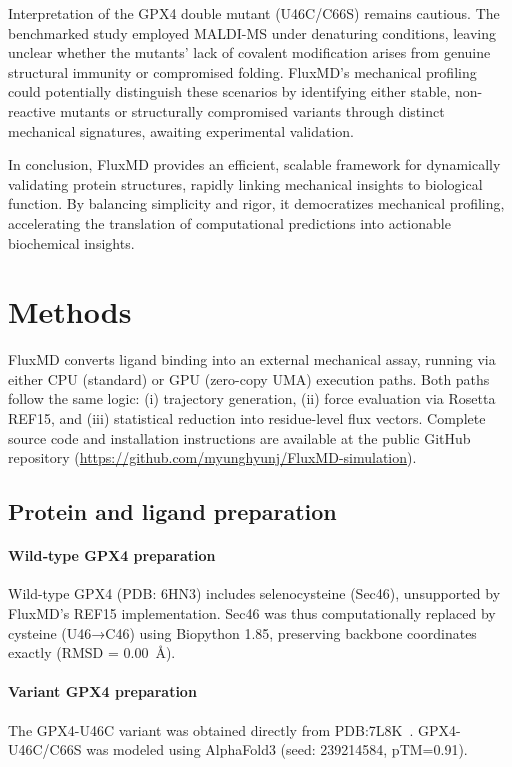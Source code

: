 \documentclass[pdflatex,sn-mathphys-num]{sn-jnl}
\begin{document}
Interpretation of the GPX4 double mutant (U46C/C66S) remains cautious. The benchmarked study\cite{Liu2022} employed MALDI-MS under denaturing conditions, leaving unclear whether the mutants' lack of covalent modification arises from genuine structural immunity or compromised folding. FluxMD's mechanical profiling could potentially distinguish these scenarios by identifying either stable, non-reactive mutants or structurally compromised variants through distinct mechanical signatures, awaiting experimental validation.

In conclusion, FluxMD provides an efficient, scalable framework for dynamically validating protein structures, rapidly linking mechanical insights to biological function. By balancing simplicity and rigor, it democratizes mechanical profiling, accelerating the translation of computational predictions into actionable biochemical insights.


\section*{Methods}

FluxMD converts ligand binding into an external mechanical assay, running via either CPU (standard) or GPU (zero-copy UMA) execution paths. Both paths follow the same logic: (i) trajectory generation, (ii) force evaluation via Rosetta REF15, and (iii) statistical reduction into residue-level flux vectors. Complete source code and installation instructions are available at the public GitHub repository (\url{https://github.com/myunghyunj/FluxMD-simulation}).

\subsection*{Protein and ligand preparation}

\paragraph{Wild‑type GPX4 preparation}
Wild-type GPX4 (PDB: 6HN3) includes selenocysteine (Sec46), unsupported by FluxMD's REF15 implementation. Sec46 was thus computationally replaced by cysteine (U46→C46) using Biopython 1.85, preserving backbone coordinates exactly (RMSD = 0.00~Å).

\paragraph{Variant GPX4 preparation}
The GPX4-U46C variant was obtained directly from PDB:7L8K~\cite{liu2022characterization}. GPX4-U46C/C66S was modeled using AlphaFold3 (seed: 239214584, pTM=0.91).
\end{document}
